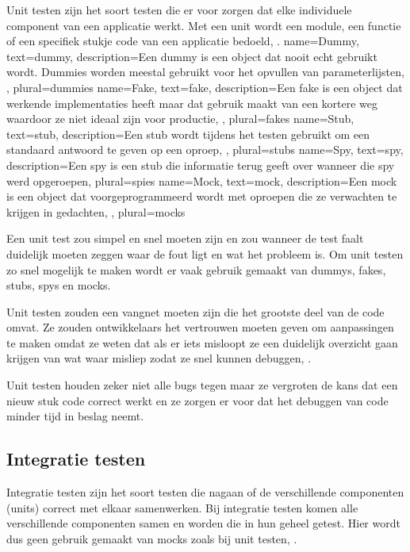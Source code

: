 Unit testen zijn het soort testen die er voor zorgen dat elke individuele component van een applicatie werkt. Met een unit wordt een module, een functie of een specifiek stukje code van een applicatie bedoeld, \textcite{Elliott2016}.
{
    name=Dummy,
    text=dummy,
    description={Een dummy is een object dat nooit echt gebruikt wordt. Dummies worden meestal gebruikt voor het opvullen van parameterlijsten, \textcite{Fowler2007}},
    plural={dummies}
}
{
    name=Fake,
    text=fake,
    description={Een fake is een object dat werkende implementaties heeft maar dat gebruik maakt van een kortere weg waardoor ze niet ideaal zijn voor productie, \textcite{Fowler2007}},
    plural={fakes}
}
{
    name=Stub,
    text=stub,
    description={Een stub wordt tijdens het testen gebruikt om een standaard antwoord te geven op een oproep, \textcite{Fowler2007}},
    plural={stubs}
}
{
    name=Spy,
    text=spy,
    description={Een spy is een \gls{stub} die informatie terug geeft over wanneer die spy werd opgeroepen, \textcite{Fowler2007}}
    plural={spies}
}
{
    name=Mock,
    text=mock,
    description={Een mock is een object dat voorgeprogrammeerd wordt met oproepen die ze verwachten te krijgen in gedachten, \textcite{Fowler2007}},
    plural={mocks}
}

Een unit test zou simpel en snel moeten zijn en zou wanneer de test faalt duidelijk moeten zeggen waar de fout ligt en wat het probleem is. Om unit testen zo snel mogelijk te maken wordt er vaak gebruik gemaakt van \glspl{dummy}, \glspl{fake}, \glspl{stub}, \glspl{spy} en \glspl{mock}. 

Unit testen zouden een vangnet moeten zijn die het grootste deel van de code omvat. Ze zouden ontwikkelaars het vertrouwen moeten geven om aanpassingen te maken omdat ze weten dat als er iets misloopt ze een duidelijk overzicht gaan krijgen van wat waar misliep zodat ze snel kunnen debuggen, \textcite{Zilberfeld2013}.

Unit testen houden zeker niet alle bugs tegen maar ze vergroten de kans dat een nieuw stuk code correct werkt en ze zorgen er voor dat het debuggen van code minder tijd in beslag neemt.

\subsection{Integratie testen}

Integratie testen zijn het soort testen die nagaan of de verschillende componenten (units) correct met elkaar samenwerken. Bij integratie testen komen alle verschillende componenten samen en worden die in hun geheel getest. Hier wordt dus geen gebruik gemaakt van \glspl{mock} zoals bij unit testen, \textcite{Reselman2017}.

